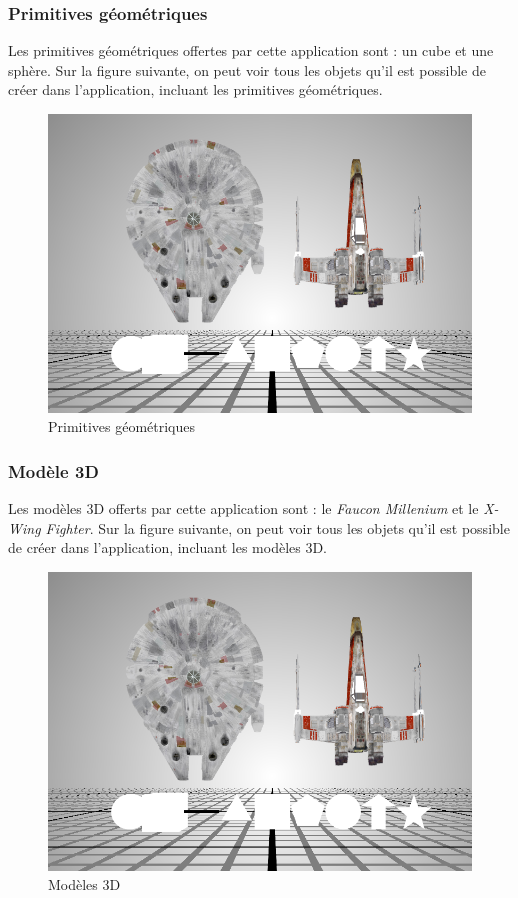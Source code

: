 \subsubsection{Primitives géométriques}
Les primitives géométriques offertes par cette application sont : un cube et une sphère.
Sur la figure suivante, on peut voir tous les objets qu'il est possible de créer dans l'application, incluant les primitives géométriques.
\begin{figure}[H]
    \centering
	\includegraphics[scale=0.8]{fig/shapes.PNG}
	\caption{Primitives géométriques}
	\label{fig:primitivesgeo}
\end{figure}

\subsubsection{Modèle 3D}
Les modèles 3D offerts par cette application sont : le \textit{Faucon Millenium} et le \textit{X-Wing Fighter}.
Sur la figure suivante, on peut voir tous les objets qu'il est possible de créer dans l'application, incluant les modèles 3D.
\begin{figure}[H]
    \centering
	\includegraphics[scale=0.8]{fig/shapes.PNG}
	\caption{Modèles 3D}
	\label{fig:modeles3D}
\end{figure}


